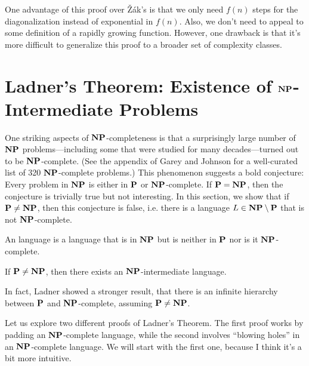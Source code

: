 \begin{remark}
  One advantage of this proof over Žák's is that we only need $f(n)$ steps for the diagonalization instead of exponential in $f(n)$. Also, we don't need to appeal to some definition of a rapidly growing function. However, one drawback is that it's more difficult to generalize this proof to a broader set of complexity classes.
\end{remark}

\section{Ladner's Theorem: Existence of $\textbf{NP}$-Intermediate Problems}
One striking aspects of $\textbf{NP}$-completeness is that a surprisingly large number of $\textbf{NP}$ problems—including some that were studied for many decades—turned out to be $\textbf{NP}$-complete. (See the appendix of Garey and Johnson \cite{garey1979computers} for a well-curated list of 320 $\textbf{NP}$-complete problems.) This phenomenon suggests a bold conjecture: Every problem in $\textbf{NP}$ is either in $\textbf{P}$ or $\textbf{NP}$-complete. If $\textbf{P} = \textbf{NP}$, then the conjecture is trivially true but not interesting. In this section, we show that if $\textbf{P} \neq \textbf{NP}$, then this conjecture is false, i.e. there is a language $L \in \textbf{NP} \setminus \textbf{P}$ that is not $\textbf{NP}$-complete.

\begin{definition}
  An  language is a language that is in $\textbf{NP}$ but is neither in $\textbf{P}$ nor is it $\textbf{NP}$-complete.
\end{definition}

\begin{theorem}
  If $\textbf{P} \neq \textbf{NP}$, then there exists an $\textbf{NP}$-intermediate language.
\end{theorem}

\begin{remark}
  In fact, Ladner \cite{ladner1975structure} showed a stronger result, that there is an infinite hierarchy between $\textbf{P}$ and $\textbf{NP}$-complete, assuming $\textbf{P} \neq \textbf{NP}$.
\end{remark}

Let us explore two different proofs of Ladner's Theorem. The first proof works by padding an $\textbf{NP}$-complete language, while the second involves ``blowing holes'' in an $\textbf{NP}$-complete language. We will start with the first one, because I think it's a bit more intuitive.

